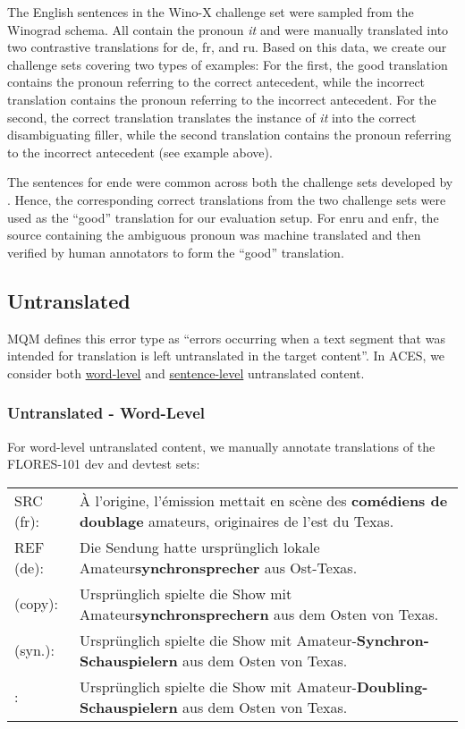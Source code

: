 \documentclass[11pt]{article}
\newcommand{\cmark}{\textcolor{darkpastelgreen}{\ding{51}}}\newcommand{\xmark}{\textcolor{darkpastelred}{\ding{55}}}
\begin{document}
The English sentences in the Wino-X challenge set were sampled from the Winograd schema. All contain the pronoun \textit{it} and were manually translated into two contrastive translations for de, fr, and ru. Based on this data, we create our challenge sets covering two types of examples: For the first, the good translation contains the pronoun referring to the correct antecedent, while the incorrect translation contains the pronoun referring to the incorrect antecedent. For the second, the correct translation translates the instance of \textit{it} into the correct disambiguating filler, while the second translation contains the pronoun referring to the incorrect antecedent (see example above).

The sentences for ende were common across both the challenge sets developed by \citet{emelin-sennrich-2021-wino}. Hence, the corresponding correct translations from the two challenge sets were used as the ``good'' translation for our evaluation setup. For enru and enfr, the source containing the ambiguous pronoun was machine translated and then verified by human annotators to form the ``good'' translation.


\subsection{Untranslated}
\label{sec:untranslated}
MQM defines this error type as ``errors occurring when a text segment that was intended for translation is left untranslated in the target content''. In \textsc{ACES}, we consider both \hyperref[subsec:real_untranslated]{word-level} and \hyperref[subsec:sent-untranslated]{sentence-level} untranslated content.

\subsubsection{Untranslated - Word-Level}
\label{subsec:real_untranslated}

For word-level untranslated content, we manually annotate translations of the FLORES-101 dev and devtest sets: 

\begin{small}
\vspace{0.5cm}
\setlength{\extrarowheight}{0.1cm}
\begin{tabularx}{0.95\columnwidth}{lX}
     SRC (fr): & À l'origine, l'émission mettait en scène des \textbf{comédiens de doublage} amateurs, originaires de l'est du Texas. \\
     REF (de): & Die Sendung hatte ursprünglich lokale Amateur\textbf{synchronsprecher} aus Ost-Texas. \\
     \cmark{} (copy): & Ursprünglich spielte die Show mit Amateur\textbf{synchronsprechern} aus dem Osten von Texas. \\
     \cmark{} (syn.): & Ursprünglich spielte die Show mit Amateur-\textbf{Synchron-Schauspielern} aus dem Osten von Texas. \\
     \xmark: & Ursprünglich spielte die Show mit Amateur-\textbf{Doubling-Schauspielern} aus dem Osten von Texas. \vspace{0.35cm}
\end{tabularx}
\end{small}
\end{document}

